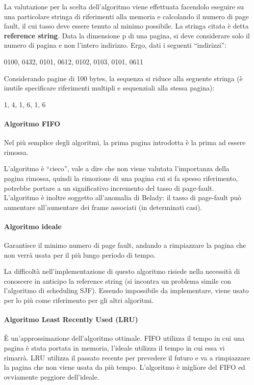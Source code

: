 \documentclass[a4]{article}
\begin{document}
La valutazione per la scelta dell'algoritmo viene effettuata facendolo eseguire su una particolare stringa di riferimenti alla memoria e calcolando il numero di page fault, il cui tasso deve essere tenuto al minimo possibile. La stringa citata è detta \textbf{reference string}. Data la dimensione p di una pagina, si deve considerare solo il numero di pagina e non l'intero indirizzo. Ergo, dati i seguenti ``indirizzi'':

0100, 0432, 0101, 0612, 0102, 0103, 0101, 0611

Considerando pagine di 100 bytes, la sequenza si riduce alla seguente stringa (è inutile specificare riferimenti multipli e sequenziali alla stessa pagina):

1, 4, 1, 6, 1, 6

\paragraph{Algoritmo FIFO}
Nel più semplice degli algoritmi, la prima pagina introdotta è la prima ad essere rimossa.

L'algoritmo è ``cieco'', vale a dire che non viene valutata l'importanza della pagina rimossa, quindi la rimozione di una pagina cui si fa spesso riferimento, potrebbe portare a un significativo incremento del tasso di page-fault. L'algoritmo è inoltre soggetto all'anomalia di Belady: il tasso di page-fault può aumentare all'aumentare dei frame associati (in determinati casi).

\paragraph{Algoritmo ideale}
Garantisce il minimo numero di page fault, andando a rimpiazzare la pagina che non verrà usata per il più lungo periodo di tempo.

La difficoltà nell'implementazione di questo algoritmo risiede nella necessità di conoscere in anticipo la reference string (si incontra un problema simile con l'algoritmo di scheduling SJF). Essendo impossibile da implementare, viene usato per lo più come riferimento per gli altri algoritmi.

\paragraph{Algoritmo Least Recently Used (LRU)} È un'approssimazione dell'algoritmo ottimale. FIFO utilizza il tempo in cui una pagina è stata portata in memoria, l'ideale utilizza il tempo in cui essa vi rimarrà. LRU utilizza il passato recente per prevedere il futuro e va a rimpiazzare la pagina che non viene usata da più tempo. L'algoritmo è migliore del FIFO ed ovviamente peggiore dell'ideale.
\end{document}
